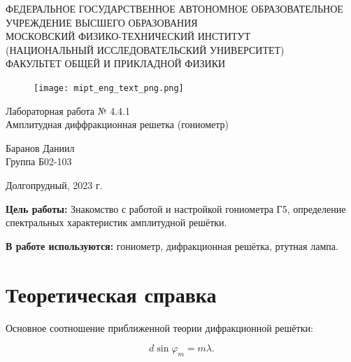 \documentclass[a4paper,12pt]{article} %
\begin{document}
\begin{center}
	\footnotesize{ФЕДЕРАЛЬНОЕ ГОСУДАРСТВЕННОЕ АВТОНОМНОЕ ОБРАЗОВАТЕЛЬНОЕ 			УЧРЕЖДЕНИЕ ВЫСШЕГО ОБРАЗОВАНИЯ}\\
	\footnotesize{МОСКОВСКИЙ ФИЗИКО-ТЕХНИЧЕСКИЙ ИНСТИТУТ\\(НАЦИОНАЛЬНЫЙ 			ИССЛЕДОВАТЕЛЬСКИЙ УНИВЕРСИТЕТ)}\\
	\footnotesize{ФАКУЛЬТЕТ ОБЩЕЙ И ПРИКЛАДНОЙ ФИЗИКИ\\}
	\hfill \break
	\hfill \break
	\hfill \break
	\hfill \break
\end{center}


\begin{figure}[h]
    \centering
    \texttt{[image: mipt\_eng\_text\_png.png]}
    \label{fig:my_label}
\end{figure}


\begin{center}   
    \hfill \break
	\hfill \break
	\hfill \break
	\large{Лабораторная работа № 4.4.1\\ \hfill \break\Large{Амплитудная диффракционная решетка (гониометр)}}\\
	\hfill \break
	\hfill \break
	\hfill \break
	\hfill \break
	\begin{flushright}
		Баранов Даниил\\
		Группа Б02-103
	\end{flushright}
	\hfill \break
	\hfill \break
	\hfill \break
\end{center}
\hfill \break
\hfill \break
\hfill \break
\hfill \break
\begin{center}
	Долгопрудный, 2023 г.
\end{center}
\thispagestyle{empty}

\newpage

\textbf{Цель работы:} Знакомство с работой и настройкой гониометра Г5, определение спектральных характеристик амплитудной решётки.

\textbf{В работе используются:} гониометр, дифракционная решётка, ртутная лампа.


\section{Теоретическая справка}

Основное соотношение приближенной теории дифракционной решётки:

	\begin{equation}
	d\sin \varphi_m = m\lambda.
 \label{main}
	\end{equation}
 
\end{document}
